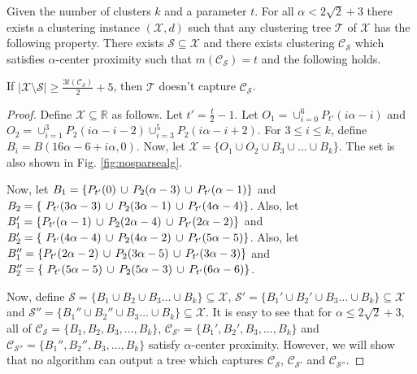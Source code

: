 \documentclass[anon,12pt]{colt2016} %
\newcommand{\mc}{\mathcal}
\begin{document}
\begin{theorem}
\label{thm:nosparsealg}
Given the number of clusters $k$ and a parameter $t$. For all $\alpha < 2\sqrt 2 + 3$ there exists a clustering instance $(\mc X, d)$ such that any clustering tree $\mc T$ of $\mc X$ has  the following property. There exists $\mc S \subseteq \mc X$ and there exists clustering $\mc C_{\mc S}$ which satisfies $\alpha$-center proximity such that $m(\mc C_{\mc S}) = t$ and the following holds. 

If $|\mc X \setminus \mc S| \ge \frac{3t(\mc C_{\mc S})}{2}+5$, then $\mc T$ doesn't capture $\mc C_{\mc S}$.
\end{theorem}

\begin{proof}
Define $\mc X \subseteq \mathbb{R}$ as follows. Let $t' = \frac{t}{2}-1$. Let $O_1 = \cup_{i=0}^6 P_{t'}(i\alpha-i)$ and $O_2 = \cup_{i=1}^3 P_2(i\alpha-i-2) \cup_{i=3}^5 P_2(i\alpha-i+2)$. For $3\le i\le k$, define $B_i = B(16\alpha-6+i\alpha, 0)$. Now, let $\mc X = \{O_1 \cup O_2 \cup B_3 \cup \ldots \cup B_k\}$. The set is also shown in Fig. \ref{fig:nosparsealg}.

Now, let $B_1 = \{P_{t'}(0) \thinspace\cup\thinspace  P_{2}(\alpha-3) \thinspace\cup\thinspace P_{t'}(\alpha-1) \}$ and $B_2 = \{\ P_{t'}(3\alpha-3) \thinspace\cup\thinspace P_{2}(3\alpha-1)\thinspace\cup\thinspace P_{t'}(4\alpha-4)\}$. Also, let $B_1' = \{P_{t'}(\alpha-1) \thinspace\cup\thinspace  P_{2}(2\alpha-4) \thinspace\cup\thinspace P_{t'}(2\alpha-2) \}$ and $B_2' = \{\ P_{t'}(4\alpha-4) \thinspace\cup\thinspace P_{2}(4\alpha-2)\thinspace\cup\thinspace P_{t'}(5\alpha-5)\}$. Also, let $B_1'' = \{P_{t'}(2\alpha-2) \thinspace\cup\thinspace  P_{2}(3\alpha-5) \thinspace\cup\thinspace P_{t'}(3\alpha-3) \}$ and $B_2'' = \{\ P_{t'}(5\alpha-5) \thinspace\cup\thinspace P_{2}(5\alpha-3)\thinspace\cup\thinspace P_{t'}(6\alpha-6)\}$. 

Now, define $\mc S = \{B_1 \cup B_2 \cup B_3\ldots \cup B_k\} \subseteq \mc X$, $\mc S' = \{B_1' \cup B_2' \cup B_3\ldots \cup B_k\} \subseteq \mc X$ and $\mc S'' = \{B_1'' \cup B_2'' \cup B_3\ldots \cup B_k\} \subseteq \mc X$. It is easy to see that for $\alpha \le 2\sqrt{2} + 3$, all of $\mc C_{\mc S} = \{B_1, B_2, B_3, \ldots, B_k\}$, $\mc C_{\mc S'} = \{B_1', B_2', B_3, \ldots, B_k\}$ and $\mc C_{\mc S''} = \{B_1'', B_2'', B_3, \ldots, B_k\}$ satisfy $\alpha$-center proximity. However, we will show that no algorithm can output a tree which captures $\mc C_{\mc S}$, $\mc C_{\mc S'}$ and $\mc C_{\mc S''}$.


\end{proof}
\end{document}
